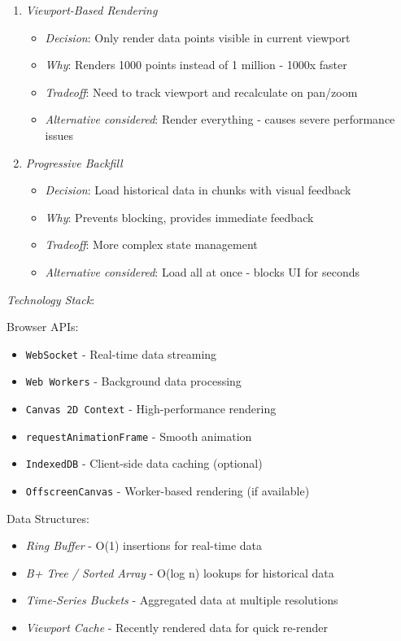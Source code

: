 \documentclass[11pt]{article}
\begin{document}
\begin{enumerate}
\item \emph{Viewport-Based Rendering}

\begin{itemize}
\item \emph{Decision}: Only render data points visible in current viewport
\item \emph{Why}: Renders 1000 points instead of 1 million - 1000x faster
\item \emph{Tradeoff}: Need to track viewport and recalculate on pan/zoom
\item \emph{Alternative considered}: Render everything - causes severe performance issues
\end{itemize}

\item \emph{Progressive Backfill}

\begin{itemize}
\item \emph{Decision}: Load historical data in chunks with visual feedback
\item \emph{Why}: Prevents blocking, provides immediate feedback
\item \emph{Tradeoff}: More complex state management
\item \emph{Alternative considered}: Load all at once - blocks UI for seconds
\end{itemize}
\end{enumerate}

\emph{Technology Stack}:

Browser APIs:

\begin{itemize}
\item \texttt{WebSocket} - Real-time data streaming
\item \texttt{Web Workers} - Background data processing
\item \texttt{Canvas 2D Context} - High-performance rendering
\item \texttt{requestAnimationFrame} - Smooth animation
\item \texttt{IndexedDB} - Client-side data caching (optional)
\item \texttt{OffscreenCanvas} - Worker-based rendering (if available)
\end{itemize}

Data Structures:

\begin{itemize}
\item \emph{Ring Buffer} - O(1) insertions for real-time data
\item \emph{B+ Tree / Sorted Array} - O(log n) lookups for historical data
\item \emph{Time-Series Buckets} - Aggregated data at multiple resolutions
\item \emph{Viewport Cache} - Recently rendered data for quick re-render
\end{itemize}
\end{document}
